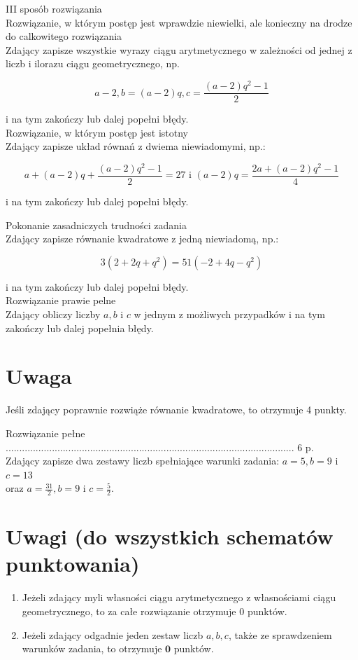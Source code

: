 \documentclass[10pt]{article}
\begin{document}
III sposób rozwiązania\\
Rozwiązanie, w którym postęp jest wprawdzie niewielki, ale konieczny na drodze do calkowitego rozwiązania\\
Zdający zapisze wszystkie wyrazy ciągu arytmetycznego w zależności od jednej z liczb i ilorazu ciągu geometrycznego, np.

$$
a-2, b=(a-2) q, c=\frac{(a-2) q^{2}-1}{2}
$$

i na tym zakończy lub dalej popełni błędy.\\
Rozwiązanie, w którym postęp jest istotny\\
Zdający zapisze układ równań z dwiema niewiadomymi, np.:

$$
a+(a-2) q+\frac{(a-2) q^{2}-1}{2}=27 \text { i }(a-2) q=\frac{2 a+(a-2) q^{2}-1}{4}
$$

i na tym zakończy lub dalej popełni błędy.

Pokonanie zasadniczych trudności zadania\\
Zdający zapisze równanie kwadratowe z jedną niewiadomą, np.:

$$
3\left(2+2 q+q^{2}\right)=51\left(-2+4 q-q^{2}\right)
$$

i na tym zakończy lub dalej popełni błędy.\\
Rozwiązanie prawie pelne\\
Zdający obliczy liczby $a, b$ i $c$ w jednym z możliwych przypadków i na tym zakończy lub dalej popełnia błędy.

\section*{Uwaga}
Jeśli zdający poprawnie rozwiąże równanie kwadratowe, to otrzymuje 4 punkty.

Rozwiązanie pełne .......................................................................................................... 6 p.\\
Zdający zapisze dwa zestawy liczb spełniające warunki zadania: $a=5, b=9$ i $c=13$\\
oraz $a=\frac{31}{2}, b=9$ i $c=\frac{5}{2}$.

\section*{Uwagi (do wszystkich schematów punktowania)}
\begin{enumerate}
  \item Jeżeli zdający myli własności ciągu arytmetycznego z własnościami ciągu geometrycznego, to za całe rozwiązanie otrzymuje 0 punktów.
  \item Jeżeli zdający odgadnie jeden zestaw liczb $a, b, c$, także ze sprawdzeniem warunków zadania, to otrzymuje $\mathbf{0}$ punktów.
\end{enumerate}
\end{document}
